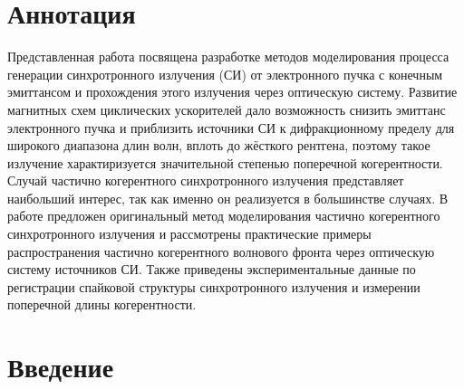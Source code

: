 \chapter*{Аннотация}							%
Представленная работа посвящена разработке методов моделирования процесса генерации синхротронного излучения (СИ) от электронного пучка с конечным эмиттансом и прохождения этого излучения через оптическую систему. Развитие магнитных схем циклических ускорителей дало возможность снизить эмиттанс электронного пучка и приблизить источники СИ к дифракционному пределу для широкого диапазона длин волн, вплоть до жёсткого рентгена, поэтому такое излучение характиризуется значительной степенью поперечной когерентности. Случай частично когерентного синхротронного излучения представляет наибольший интерес, так как именно он реализуется в большинстве случаях. В работе предложен оригинальный метод моделирования частично когерентного синхротронного излучения и рассмотрены практические примеры распространения частично когерентного волнового фронта через оптическую систему источников СИ. Также приведены экспериментальные данные по регистрации спайковой структуры синхротронного излучения и измерении поперечной длины когерентности.

\chapter*{Введение}							%

\newcommand{\actuality}{Актуальность}
\newcommand{\aim}{\textbf{Целью}}
\newcommand{\tasks}{Задачи}
\newcommand{\defpositions}{\textbf{Основные положения, выносимые на~защиту:}}
\newcommand{\novelty}{\textbf{Научная новизна}}
\newcommand{\influence}{\textbf{Научная и практическая значимость}}
\newcommand{\reliability}{\textbf{Степень достоверности}}
\newcommand{\probation}{\textbf{Апробация работы.}}
\newcommand{\contribution}{\textbf{Личный вклад.}}
\newcommand{\publications}{\textbf{Публикации.}}


